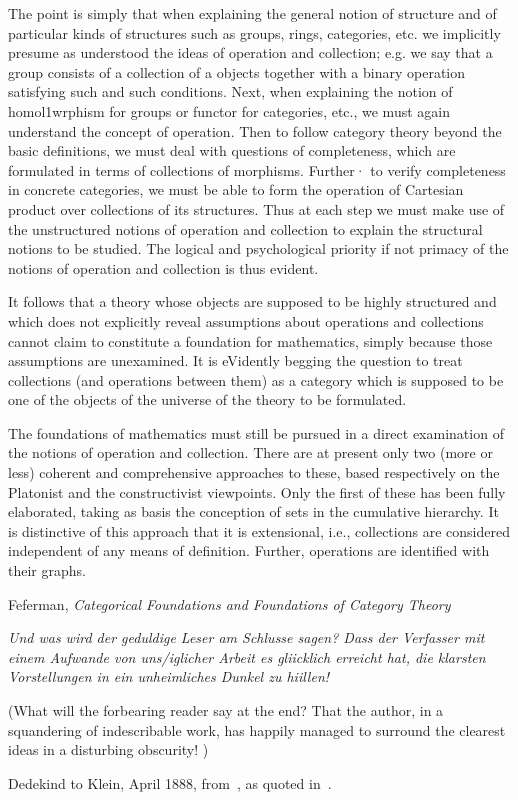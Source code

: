 \documentclass[11pt,openany]{article}
\begin{document}
\epigraph{The point is simply that when explaining the general notion of
structure and of particular kinds of structures such as groups, rings,
categories, etc. we implicitly presume as understood the ideas of
operation and collection; e.g. we say that a group consists of a collection
of a objects together with a binary operation satisfying such and
such conditions. Next, when explaining the notion of homol1wrphism
for groups or functor for categories, etc., we must again understand the
concept of operation. Then to follow category theory beyond the basic
definitions, we must deal with questions of completeness, which are
formulated in terms of collections of morphisms. Further· to verify
completeness in concrete categories, we must be able to form the
operation of Cartesian product over collections of its structures. Thus
at each step we must make use of the unstructured notions of operation
and collection to explain the structural notions to be studied. The
logical and psychological priority if not primacy of the notions of
operation and collection is thus evident.
\par
It follows that a theory whose objects are supposed to be highly
structured and which does not explicitly reveal assumptions about
operations and collections cannot claim to constitute a foundation for
mathematics, simply because those assumptions are unexamined. It is
eVidently begging the question to treat collections (and operations
between them) as a category which is supposed to be one of the objects
of the universe of the theory to be formulated.
\par
The foundations of mathematics must still be pursued in a direct
examination of the notions of operation and collection. There are at
present only two (more or less) coherent and comprehensive approaches
to these, based respectively on the Platonist and the constructivist
viewpoints. Only the first of these has been fully elaborated,
taking as basis the conception of sets in the cumulative hierarchy. It is
distinctive of this approach that it is extensional, i.e., collections are
considered independent of any means of definition. Further, operations
are identified with their graphs.}
{Feferman,
\textit{Categorical Foundations and Foundations of Category 
Theory}~\cite{feferman1977Categorical}}

\label{sec:Complexity}

\epigraph{
\textsl{Und was wird der geduldige Leser am
Schlusse sagen? Dass der Verfasser mit einem Aufwande von uns/iglicher Arbeit es gliicklich
erreicht hat, die klarsten Vorstellungen in ein unheimliches Dunkel zu hiillen!}
\par
(What will the forbearing reader say at the end? That the author, in a squandering of indescribable
work, has happily managed to surround the clearest ideas in a disturbing obscurity!
)}%
{Dedekind to Klein, April 1888, 
from~\cite{dugac1976DedekindFondements},
as quoted in~\cite{ferreiros2007labyrinth}.}
\end{document}
